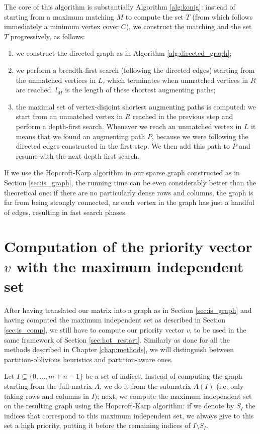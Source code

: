The core of this algorithm is substantially Algorithm \ref{alg:konig}: instead of starting from a maximum matching $M$ to compute the set $T$ (from which follows immediately a minimum vertex cover $C$), we construct the matching and the set $T$ progressively, as follows:

\begin{enumerate}
	\item we construct the directed graph as in Algorithm \ref{alg:directed_graph};
	\item we perform a breadth-first search (following the directed edges) starting from the unmatched vertices in $L$, which terminates when unmatched vertices in $R$ are reached. $l_M$ is the length of these shortest augmenting paths;
	\item the maximal set of vertex-disjoint shortest augmenting paths is computed: we start from an unmatched vertex in $R$ reached in the previous step and perform a depth-first search. Whenever we reach an unmatched vertex in $L$ it means that we found an augmenting path $P$, because we were following the directed edges constructed in the first step. We then add this path to $P$ and resume with the next depth-first search. 
\end{enumerate}

If we use the Hopcroft-Karp algorithm in our sparse graph constructed as in Section \ref{sec:is_graph}, the running time can be even considerably better than the theoretical one: if there are no particularly dense rows and columns, the graph is far from being strongly connected, as each vertex in the graph has just a handful of edges, resulting in fast search phases.

\section{Computation of the priority vector $v$ with the maximum independent set} \label{sec:is_vector}

After having translated our matrix into a graph as in Section \ref{sec:is_graph} and having computed the maximum independent set as described in Section \ref{sec:is_comp}, we still have to compute our priority vector $v$, to be used in the same framework of Section \ref{sec:hot_restart}. Similarly as done for all the methods described in Chapter \ref{chap:methods}, we will distinguish between partition-oblivious heuristics and partition-aware ones.

Let $I \subseteq \{ 0,\dots,m+n-1\}$ be a set of indices. Instead of computing the graph starting from the full matrix $A$, we do it from the submatrix $A(I)$ (i.e. only taking rows and columns in $I$); next, we compute the maximum independent set on the resulting graph using the Hopcroft-Karp algorithm: if we denote by $S_I$ the indices that correspond to this maximum independent set, we always give to this set a high priority, putting it before the remaining indices of $I \setminus S_I$. 

